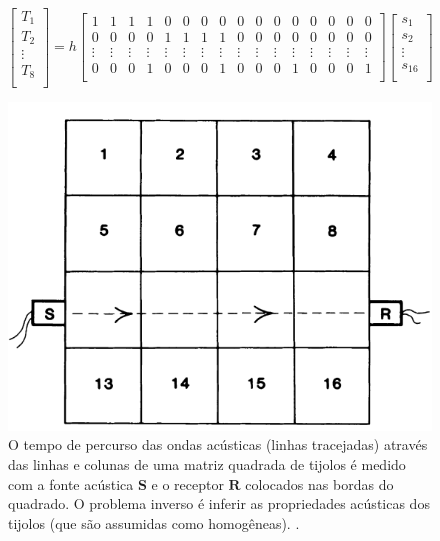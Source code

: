 \documentclass[a4paper, 12 pt]{article} %
\begin{document}
\begin{equation}\label{eq:matriz_tomografia}
\begin{bmatrix}
T_{1} \\
T_{2} \\
\vdots \\
T_{8}\\
\end{bmatrix} = h \left[
\begin{array}{cccccccccccccccc}
1 & 1 & 1 & 1 & 0 & 0 & 0 & 0 & 0 & 0 & 0 & 0 & 0 & 0 & 0 & 0 \\
0 & 0 & 0 & 0 & 1 & 1 & 1 & 1 & 0 & 0 & 0 & 0 & 0 & 0 & 0 & 0 \\
\vdots & \vdots & \vdots & \vdots & \vdots & \vdots & \vdots & \vdots & \vdots & \vdots & \vdots & \vdots & \vdots & \vdots & \vdots & \vdots \\
0 & 0 & 0 & 1 & 0 & 0 & 0 & 1 & 0 & 0 & 0 & 1 & 0 & 0 & 0 & 1 \\
\end{array}\right]
\begin{bmatrix}
s_{1} \\
s_{2} \\
\vdots \\
s_{16}\\
\end{bmatrix}
\end{equation}

\begin{figure}[!hbtp]
	\begin{center}
		\includegraphics[scale=0.45]{Figuras/tomografia.png}
	\end{center}
	\caption{O tempo de percurso das ondas acústicas (linhas tracejadas) através das linhas e colunas de uma matriz quadrada de tijolos é medido com a fonte acústica $\textbf{S}$ e o receptor $\textbf{R}$ colocados nas bordas do quadrado. O problema inverso é inferir as propriedades acústicas dos tijolos (que são assumidas como homogêneas). \cite{menke1984geophysical}.}
	\label{tomografia}
\end{figure}
\end{document}
